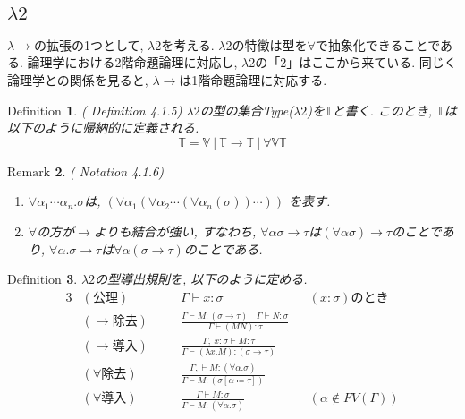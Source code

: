 \documentclass[11pt]{jsreport}
\theoremstyle{mystyle}
\newtheorem{df}{$\textrm{Definition}$}[section]
\newtheorem{rmk}[df]{$\textrm{Remark}$}
\newcommand{\T}{\mathbb{T}}
\newcommand{\V}{\mathbb{V}}
\newcommand{\lama}{\lambda \! \! \to}
\newcommand{\0}{\textbf{0}}
\begin{document}
\subsection*{$\lambda 2$}
$\lama$の拡張の1つとして, $\lambda 2$を考える. $\lambda$2の特徴は型を$\forall$で抽象化できることである. 論理学における2階命題論理に対応し, $\lambda$2の「2」はここから来ている. 同じく論理学との関係を見ると, $\lama$は1階命題論理に対応する. 
\begin{shadebox}
  \begin{df}{(\cite{Bar} Definition 4.1.5)}
    $\lambda 2$の型の集合Type($\lambda 2$)を$\T$と書く. 
    このとき, $\T$は以下のように帰納的に定義される. 
    \[
      \T = \V \ |\ \T \to \T \ |\ \forall \V \T
    \]
  \end{df}
\end{shadebox}
\begin{rmk}{(\cite{Bar} Notation 4.1.6)}
  \begin{enumerate}
    \item $\forall \alpha_1 \cdots \alpha_n . \sigma$は, 
             $(\forall \alpha_1(\forall \alpha_2 \cdots (\forall \alpha_n (\sigma))\cdots))$
             を表す. 
    \item $\forall$の方が$\to$よりも結合が強い, すなわち, 
             $\forall \alpha \sigma \to \tau$は$(\forall \alpha \sigma) \to \tau$のことであり, 
             $\forall \alpha . \sigma \to \tau$は$\forall \alpha (\sigma \to \tau)$のことである.
  \end{enumerate}
\end{rmk}
\begin{shadebox}
  \begin{df}
    $\lambda 2$の型導出規則を, 以下のように定める.
    \begin{alignat*}{3}
      &(\text{公理})& \quad &\Gamma \vdash x \colon \sigma& 
        &(x \colon \sigma)\text{のとき}\\
      &(\text{$\to$除去})& 
        &\frac{\Gamma \vdash M \colon (\sigma \to \tau) \quad
          \Gamma \vdash N \colon \sigma}{\Gamma \vdash (MN) \colon \tau}& & \\
      &(\text{$\to$導入})& &\frac{\Gamma,\ x \colon \sigma \vdash M \colon \tau}
        {\Gamma \vdash (\lambda x . M) \colon (\sigma \to \tau)}& & \\
      &(\text{$\forall$除去})& &\frac{\Gamma, \vdash M \colon (\forall \alpha . \sigma)}
        {\Gamma \vdash M \colon (\sigma[\alpha \coloneqq \tau])}& & \\
      &(\text{$\forall$導入})& &\frac{\Gamma \vdash M \colon \sigma}
        {\Gamma \vdash M \colon (\forall \alpha . \sigma)}& &(\alpha \notin FV(\Gamma))
    \end{alignat*}
  \end{df}
\end{shadebox}
\end{document}
